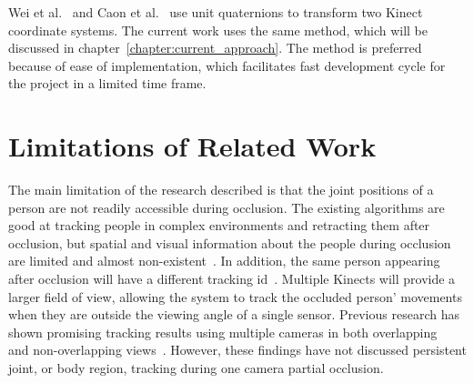 Wei et al.~\cite{wei_kinect_calibration} and Caon et al.~\cite{caon_context_aware_gesture} use unit quaternions to transform two Kinect coordinate systems. The current work uses the same method, which will be discussed in chapter~\ref{chapter:current_approach}. The method is preferred because of ease of implementation, which facilitates fast development cycle for the project in a limited time frame.

\section{Limitations of Related Work}

The main limitation of the research described is that the joint positions of a person are not readily accessible during occlusion. The existing algorithms are good at tracking people in complex environments and retracting them after occlusion, but spatial and visual information about the people during occlusion are limited and almost non-existent~\cite{munaro_tracking_within_groups_with_mobile_robot}. In addition, the same person appearing after occlusion will have a different tracking id~\cite{liu_tracking_with_pei}. Multiple Kinects will provide a larger field of view, allowing the system to track the occluded person' movements when they are outside the viewing angle of a single sensor. Previous research has shown promising tracking results using multiple cameras in both overlapping ~\cite{zhang_multiple_depth_cameras, chu_multiple_cameras_transfer_functions, yildiz_multiple_cameras_constraints, yamashita_multiple_cameras_face_detection} and non-overlapping views~\cite{cai_intercamera_context_tracking, javed_tracking_disjoint}. However, these findings have not discussed persistent joint, or body region, tracking during one camera partial occlusion.


